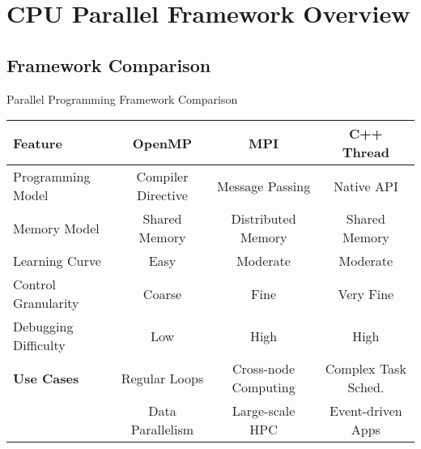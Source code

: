\section{CPU Parallel Framework Overview}

\subsection{Framework Comparison}
\begin{frame}[fragile]{ Parallel Programming Framework Comparison}
	\begin{table}[h]
		\centering
		\small
		\begin{tabular}{|l|c|c|c|}
			\hline
			\textbf{Feature}     & \textbf{OpenMP}    & \textbf{MPI}         & \textbf{C++ Thread} \\
			\hline
			Programming Model    & Compiler Directive & Message Passing      & Native API          \\
			Memory Model         & Shared Memory      & Distributed Memory   & Shared Memory       \\
			Learning Curve       & Easy               & Moderate             & Moderate            \\
			Control Granularity  & Coarse             & Fine                 & Very Fine           \\
			Debugging Difficulty & Low                & High                 & High                \\
			\hline
			\textbf{Use Cases}   & Regular Loops      & Cross-node Computing & Complex Task Sched. \\
			                     & Data Parallelism   & Large-scale HPC      & Event-driven Apps   \\
			\hline
		\end{tabular}
	\end{table}

	\vspace{1em}
\end{frame}

